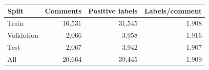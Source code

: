 \begin{tabular}{lrrr}
\toprule
Split & Comments & Positive labels & Labels/comment \\
\midrule
Train & 16,531 & 31,545 & 1.908 \\
Validation & 2,066 & 3,958 & 1.916 \\
Test & 2,067 & 3,942 & 1.907 \\
All & 20,664 & 39,445 & 1.909 \\
\bottomrule
\end{tabular}

